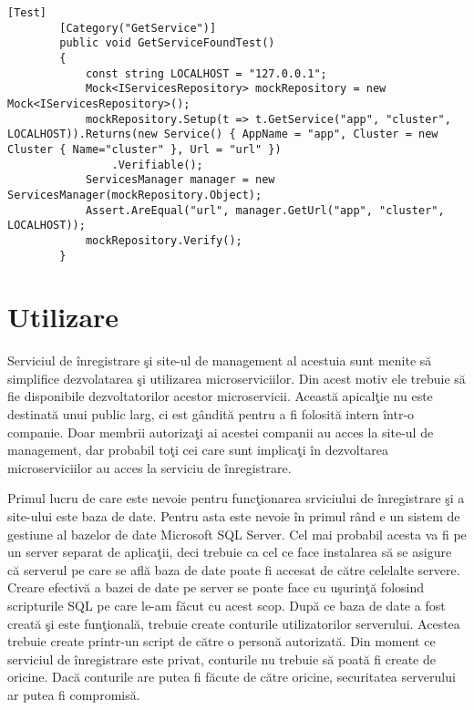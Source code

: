 \documentclass[a4paper,12pt]{report}
\begin{document}
\begin{lstlisting}[caption={Testul pentru metoda },label={lst:GetServiceTest},breaklines]
    [Test]
        [Category("GetService")]
        public void GetServiceFoundTest()
        {
			const string LOCALHOST = "127.0.0.1";
            Mock<IServicesRepository> mockRepository = new Mock<IServicesRepository>();
            mockRepository.Setup(t => t.GetService("app", "cluster", LOCALHOST)).Returns(new Service() { AppName = "app", Cluster = new Cluster { Name="cluster" }, Url = "url" })
                .Verifiable();
            ServicesManager manager = new ServicesManager(mockRepository.Object);
            Assert.AreEqual("url", manager.GetUrl("app", "cluster", LOCALHOST));
            mockRepository.Verify();
        }
\end{lstlisting}


\chapter{Utilizare}

Serviciul de \^inregistrare \c si site-ul de management al acestuia sunt menite s\u a simplifice dezvolatarea 
\c si utilizarea microserviciilor. Din acest motiv ele trebuie s\u a fie disponibile dezvoltatorilor acestor 
microservicii. Aceast\u a apical\c tie nu este destinat\u a unui public larg, ci est g\^andit\u a pentru a fi folosit\u a
intern \^intr-o companie. Doar membrii autoriza\c ti ai acestei companii au acces la site-ul de management, dar 
probabil to\c ti cei care sunt implica\c ti \^in dezvoltarea microserviciilor au acces la serviciu de \^inregistrare.

Primul lucru de care este nevoie pentru func\c tionarea srviciului de \^inregistrare \c si a site-ului este baza de date.
Pentru asta este nevoie \^in primul r\^and e un sistem de gestiune al bazelor de date Microsoft SQL Server.
Cel mai probabil acesta va fi pe un server separat de aplica\c tii, deci trebuie ca cel ce face instalarea 
s\u a se asigure c\u a serverul pe care se afl\u a baza de date poate fi accesat de c\u atre celelalte servere.
Creare efectiv\u a a bazei de date pe server se poate face cu u\c surin\c t\u a folosind scripturile SQL pe care le-am
f\u acut cu acest scop. Dup\u a ce baza de date a fost creat\u a \c si este fun\c tional\u a, trebuie create conturile 
utilizatorilor serverului. Acestea trebuie create printr-un script de c\u atre o person\u a autorizat\u a.
Din moment ce serviciul de \^inregistrare este privat, conturile nu trebuie s\u a poat\u a fi create de oricine.
Dac\u a conturile are putea fi f\u acute de c\u atre oricine, securitatea serverului ar putea fi compromis\u a.
 
\end{document}

